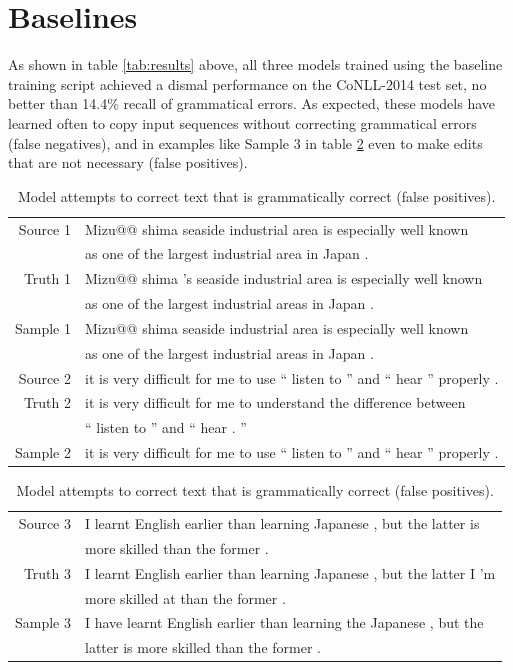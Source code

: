 \section{Baselines}
As shown in table \ref{tab:results} above, all three models trained using the baseline training script achieved a dismal performance on the CoNLL-2014 test set, no better than 14.4\% recall of grammatical errors. As expected, these models have learned often to copy input sequences without correcting grammatical errors (false negatives), and in examples like Sample 3 in table \ref{tab:baseline-samples-fp} even to make edits that are not necessary (false positives).

\begin{table}[h]
\centering
\begin{tabular}{ r l }
\tabularnewline \hline \hline
Source  1 & Mizu@@ shima seaside industrial area is especially well known \\
& as one of the largest industrial area in Japan . \\
Truth  1  &  Mizu@@ shima 's seaside industrial area is especially well known \\
& as one of the largest industrial areas in Japan . \\
Sample  1 &  Mizu@@ shima seaside industrial area is especially well known \\
& as one of the largest industrial areas in Japan . \\
\hline
Source  2 & it is very difficult for me to use `` listen to '' and `` hear '' properly . \\
Truth  2  &  it is very difficult for me to understand the difference between \\
& `` listen to '' and `` hear . '' \\
Sample  2 &  it is very difficult for me to use `` listen to '' and `` hear '' properly . \\
\hline
\end{tabular}
\caption{Model copies input without correcting grammatical errors (false negatives).} \label{tab:baseline-samples-fn}
\begin{tabular}{ r l }
\tabularnewline \hline \hline
Source  3 & I learnt English earlier than learning Japanese , but the latter is \\
& more skilled than the former . \\
Truth  3  &  I learnt English earlier than learning Japanese , but the latter I 'm \\
& more skilled at than the former . \\
Sample  3 &  I have learnt English earlier than learning the Japanese , but the \\
& latter is more skilled than the former . \\
\hline
\end{tabular}
\caption{Model attempts to correct text that is grammatically correct (false positives).} \label{tab:baseline-samples-fp}
\end{table}

